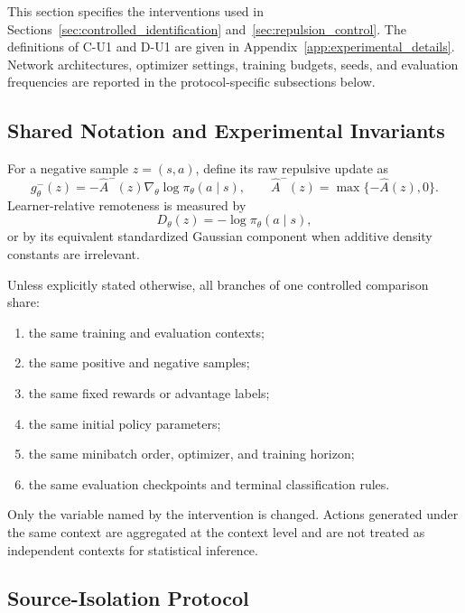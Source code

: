 \documentclass[sigconf,anonymous,review]{acmart}
\theoremstyle{acmdefinition}
\begin{document}
This section specifies the interventions used in
Sections~\ref{sec:controlled_identification}
and~\ref{sec:repulsion_control}. The definitions of C-U1 and D-U1 are given in
Appendix~\ref{app:experimental_details}. Network architectures,
optimizer settings, training budgets, seeds, and evaluation frequencies
are reported in the protocol-specific subsections below.

\subsection{Shared Notation and Experimental Invariants}
\label{app:controlled_shared}

For a negative sample
$z=(s,a)$, define its raw repulsive update as
\begin{equation}
    g_\theta^-(z)
    =
    -\widehat A^-(z)
    \nabla_\theta
    \log\pi_\theta(a\mid s),
    \qquad
    \widehat A^-(z)
    =
    \max\{-\widehat A(z),0\}.
    \label{eq:controlled_negative_update}
\end{equation}
Learner-relative remoteness is measured by
\begin{equation}
    D_\theta(z)
    =
    -\log\pi_\theta(a\mid s),
    \label{eq:controlled_remoteness}
\end{equation}
or by its equivalent standardized Gaussian component when additive
density constants are irrelevant.

Unless explicitly stated otherwise, all branches of one controlled
comparison share:

\begin{enumerate}
    \item the same training and evaluation contexts;
    \item the same positive and negative samples;
    \item the same fixed rewards or advantage labels;
    \item the same initial policy parameters;
    \item the same minibatch order, optimizer, and training horizon;
    \item the same evaluation checkpoints and terminal classification
    rules.
\end{enumerate}

Only the variable named by the intervention is changed. Actions generated
under the same context are aggregated at the context level and are not
treated as independent contexts for statistical inference.


\subsection{Source-Isolation Protocol}
\label{app:source_isolation_protocol}
\end{document}
